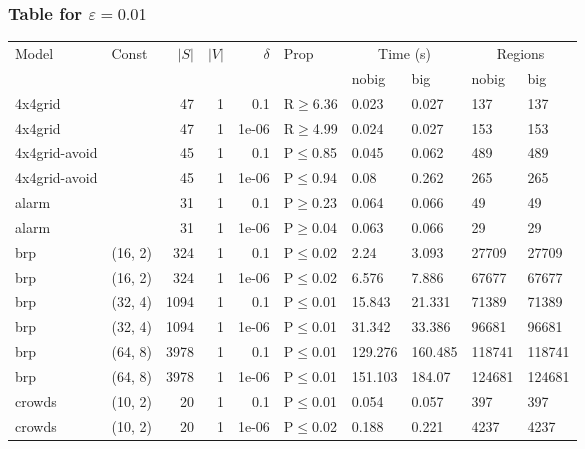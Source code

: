 \subsubsection{Table for \(\varepsilon=0.01\)}
\begin{longtable}{llrrrlllll}

        \toprule
        Model & Const & $|S|$ & $|V|$ & $\delta$ & Prop & \multicolumn{2}{c}{Time (s)} & \multicolumn{2}{c}{Regions} \\
        \cmidrule(ll){7-8} \cmidrule(ll){9-10}
        & & & & & & nobig & big & nobig & big \\
        \midrule
        
 4x4grid       &           &     	47 & 1 & 0.1   & R$\geq$6.36  & 0.023   & 0.027   & 137    & 137    \\
 4x4grid       &           &     	47 & 1 & 1e-06 & R$\geq$4.99  & 0.024   & 0.027   & 153    & 153    \\
 4x4grid-avoid &           &     	45 & 1 & 0.1   & P$\leq$0.85  & 0.045   & 0.062   & 489    & 489    \\
 4x4grid-avoid &           &     	45 & 1 & 1e-06 & P$\leq$0.94  & 0.08    & 0.262   & 265    & 265    \\
 alarm         &           &     	31 & 1 & 0.1   & P$\geq$0.23  & 0.064   & 0.066   & 49     & 49     \\
 alarm         &           &     	31 & 1 & 1e-06 & P$\geq$0.04  & 0.063   & 0.066   & 29     & 29     \\
 brp           & (16, 2)   &    	324 & 1 & 0.1   & P$\leq$0.02  & 2.24    & 3.093   & 27709  & 27709  \\
 brp           & (16, 2)   &    	324 & 1 & 1e-06 & P$\leq$0.02  & 6.576   & 7.886   & 67677  & 67677  \\
 brp           & (32, 4)   &   	1094 & 1 & 0.1   & P$\leq$0.01  & 15.843  & 21.331  & 71389  & 71389  \\
 brp           & (32, 4)   &   	1094 & 1 & 1e-06 & P$\leq$0.01  & 31.342  & 33.386  & 96681  & 96681  \\
 brp           & (64, 8)   &   	3978 & 1 & 0.1   & P$\leq$0.01  & 129.276 & 160.485 & 118741 & 118741 \\
 brp           & (64, 8)   &   	3978 & 1 & 1e-06 & P$\leq$0.01  & 151.103 & 184.07  & 124681 & 124681 \\
 crowds        & (10, 2)   &     	20 & 1 & 0.1   & P$\leq$0.01  & 0.054   & 0.057   & 397    & 397    \\
 crowds        & (10, 2)   &     	20 & 1 & 1e-06 & P$\leq$0.02  & 0.188   & 0.221   & 4237   & 4237   \\

\end{longtable}
